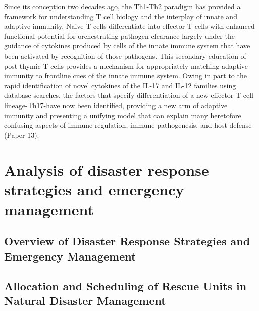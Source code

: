 \documentclass{article}
\begin{document}
Since its conception two decades ago, the Th1-Th2 paradigm has provided a framework for understanding T cell biology and the interplay of innate and adaptive immunity. Naive T cells differentiate into effector T cells with enhanced functional potential for orchestrating pathogen clearance largely under the guidance of cytokines produced by cells of the innate immune system that have been activated by recognition of those pathogens. This secondary education of post-thymic T cells provides a mechanism for appropriately matching adaptive immunity to frontline cues of the innate immune system. Owing in part to the rapid identification of novel cytokines of the IL-17 and IL-12 families using database searches, the factors that specify differentiation of a new effector T cell lineage-Th17-have now been identified, providing a new arm of adaptive immunity and presenting a unifying model that can explain many heretofore confusing aspects of immune regulation, immune pathogenesis, and host defense (Paper 13).





\clearpage
\section{Analysis of disaster response strategies and emergency management}

\subsection{Overview of Disaster Response Strategies and Emergency Management}

\subsection{Allocation and Scheduling of Rescue Units in Natural Disaster Management}
\end{document}
